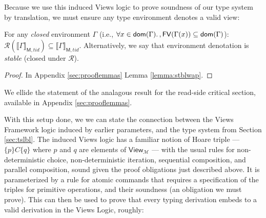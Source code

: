 
Because we use this induced Views logic to prove soundness of our type system by translation, we must ensure any type environment denotes a valid view:
\begin{lemma}\label{lemma:stblw}
For any \emph{closed} environment $\Gamma$ (i.e., $\forall x\in\mathsf{dom}(\Gamma)\ldotp, \mathsf{FV}(\Gamma(x))\subseteq\mathsf{dom}(\Gamma)$):
$
\mathcal{R}(\llbracket\Gamma\rrbracket_{\mathsf{M},tid})\subseteq\llbracket\Gamma\rrbracket_{\mathsf{M},tid}
$.
Alternatively, we say that environment denotation is \emph{stable} (closed under $\mathcal{R}$).
\end{lemma}
\begin{proof}
In Appendix \ref{sec:prooflemmas} Lemma \ref{lemma:stblwap}.
\end{proof}
We ellide the statement of the analagous result for the read-side critical section, available in Appendix \ref{sec:prooflemmas}.

With this setup done, we we can state the connection between the Views Framework logic induced by earlier parameters, and the type system from Section \ref{sec:tslbl}.
The induced Views logic has a familiar notion of Hoare triple --- $\{ p \} C \{ q \}$ where $p$ and $q$ are elements of $\mathsf{View}_\mathcal{M}$ --- with the usual rules for non-deterministic choice, non-deterministic iteration, sequential composition, and parallel composition, sound given the proof obligations just described above.  It is parameterized by a rule for atomic commands that requires a specification of the triples for primitive operations, and their soundness (an obligation we must prove).  This can then be used to prove that every typing derivation embeds to a valid derivation in the Views Logic, roughly:

